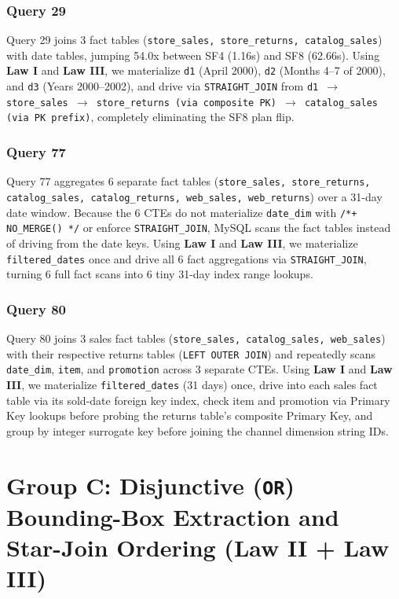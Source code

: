 \documentclass{ULBreport}
\begin{document}
\subsubsection{Query 29}
Query 29 joins 3 fact tables (\texttt{store\_sales, store\_returns, catalog\_sales}) with date tables, jumping 54.0x between SF4 (1.16s) and SF8 (62.66s). Using \textbf{Law I} and \textbf{Law III}, we materialize \texttt{d1} (April 2000), \texttt{d2} (Months 4--7 of 2000), and \texttt{d3} (Years 2000--2002), and drive via \texttt{STRAIGHT\_JOIN} from \texttt{d1 $\rightarrow$ store\_sales $\rightarrow$ store\_returns (via composite PK) $\rightarrow$ catalog\_sales (via PK prefix)}, completely eliminating the SF8 plan flip.
\subsubsection{Query 77}
Query 77 aggregates 6 separate fact tables (\texttt{store\_sales, store\_returns, catalog\_sales, catalog\_returns, web\_sales, web\_returns}) over a 31-day date window. Because the 6 CTEs do not materialize \texttt{date\_dim} with \texttt{/*+ NO\_MERGE() */} or enforce \texttt{STRAIGHT\_JOIN}, MySQL scans the fact tables instead of driving from the date keys. Using \textbf{Law I} and \textbf{Law III}, we materialize \texttt{filtered\_dates} once and drive all 6 fact aggregations via \texttt{STRAIGHT\_JOIN}, turning 6 full fact scans into 6 tiny 31-day index range lookups.
\subsubsection{Query 80}
Query 80 joins 3 sales fact tables (\texttt{store\_sales, catalog\_sales, web\_sales}) with their respective returns tables (\texttt{LEFT OUTER JOIN}) and repeatedly scans \texttt{date\_dim}, \texttt{item}, and \texttt{promotion} across 3 separate CTEs. Using \textbf{Law I} and \textbf{Law III}, we materialize \texttt{filtered\_dates} (31 days) once, drive into each sales fact table via its sold-date foreign key index, check item and promotion via Primary Key lookups before probing the returns table's composite Primary Key, and group by integer surrogate key before joining the channel dimension string IDs.


\section{Group C: Disjunctive (\texttt{OR}) Bounding-Box Extraction and Star-Join Ordering (Law II + Law III)}
\end{document}
